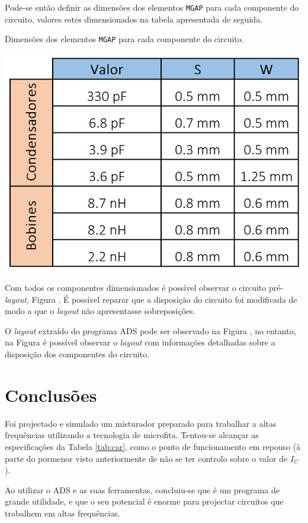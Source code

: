 \documentclass[11pt]{article}
\numberwithin{equation}{section}
\begin{document}
\vspace{1mm}
Pode-se então definir as dimensões dos elementos \texttt{MGAP} para cada componente do circuito, valores estes dimensionados na tabela apresentada de seguida. 

\begin{table}[H]
	\centering
	\caption{Dimensões dos elementos \texttt{MGAP} para cada componente do circuito.}
	\vspace{-1.5mm}
	\includegraphics[keepaspectratio=true, scale=0.40]{teoricas/aSS}
\end{table}

Com todos os componentes dimensionados é possível observar o circuito pré-\textit{layout}, Figura . É possível reparar que a disposição do circuito foi modificada de modo a que o \textit{layout} não apresentasse sobreposições.

O \textit{layout} extraído do programa ADS pode ser observado na Figura , no entanto, na Figura  é possível observar o \textit{layout} com informações detalhadas sobre a disposição dos componentes do circuito.

\section{Conclusões}

Foi projectado e simulado um misturador preparado para trabalhar a altas frequências utilizando a tecnologia de microfita. Tentou-se alcançar as especificações da Tabela \ref{tab:car}, como o ponto de funcionamento em repouso (à parte do pormenor visto anteriormente de não se ter controlo sobre o valor de $I_{C}$).

Ao utilizar o ADS e as suas ferramentas, concluiu-se que é um programa de grande utilidade, e que o seu potencial é enorme para projectar circuitos que trabalhem em altas frequências.
\end{document}
